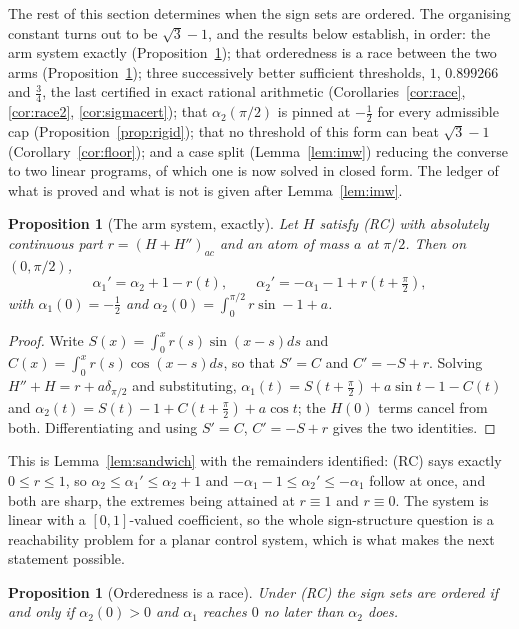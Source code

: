 \documentclass[11pt]{article}
\newtheorem{proposition}[theorem]{Proposition}
\theoremstyle{definition}
\begin{document}
The rest of this section determines when the sign sets are ordered. The organising
constant turns out to be $\sqrt3-1$, and the results below establish, in order: the arm
system exactly (Proposition~\ref{prop:armsys}); that orderedness is a race between the two
arms (Proposition~\ref{prop:race}); three successively better sufficient thresholds,
$1$, $0.899266$ and $\tfrac34$, the last certified in exact rational arithmetic
(Corollaries~\ref{cor:race}, \ref{cor:race2}, \ref{cor:sigmacert}); that $\alpha_2(\pi/2)$
is pinned at $-\tfrac12$ for every admissible cap (Proposition~\ref{prop:rigid}); that no
threshold of this form can beat $\sqrt3-1$ (Corollary~\ref{cor:floor}); and a case split
(Lemma~\ref{lem:imw}) reducing the converse to two linear programs, of which one is now
solved in closed form. The ledger of what is proved and what is not is given after
Lemma~\ref{lem:imw}.

\begin{proposition}[The arm system, exactly]\label{prop:armsys}
Let $H$ satisfy (RC) with absolutely continuous part $r=(H+H'')_{ac}$ and an atom of mass
$a$ at $\pi/2$. Then on $(0,\pi/2)$,
\[
  \alpha_1'=\alpha_2+1-r(t) ,\qquad
  \alpha_2'=-\alpha_1-1+r(t+\tfrac\pi2) ,
\]
with $\alpha_1(0)=-\tfrac12$ and $\alpha_2(0)=\int_0^{\pi/2}r\sin-1+a$.
\end{proposition}

\begin{proof}
Write $S(x)=\int_0^x r(s)\sin(x-s)ds$ and $C(x)=\int_0^x r(s)\cos(x-s)ds$, so that
$S'=C$ and $C'=-S+r$. Solving $H''+H=r+a\delta_{\pi/2}$ and substituting,
$\alpha_1(t)=S(t+\tfrac\pi2)+a\sin t-1-C(t)$ and
$\alpha_2(t)=S(t)-1+C(t+\tfrac\pi2)+a\cos t$; the $H(0)$ terms cancel from both.
Differentiating and using $S'=C$, $C'=-S+r$ gives the two identities.
\end{proof}

This is Lemma~\ref{lem:sandwich} with the remainders identified: (RC) says exactly
$0\le r\le1$, so $\alpha_2\le\alpha_1'\le\alpha_2+1$ and
$-\alpha_1-1\le\alpha_2'\le-\alpha_1$ follow at once, and both are sharp, the extremes
being attained at $r\equiv1$ and $r\equiv0$. The system is linear with a $[0,1]$-valued
coefficient, so the whole sign-structure question is a reachability problem for a planar
control system, which is what makes the next statement possible.

\begin{proposition}[Orderedness is a race]\label{prop:race}
Under (RC) the sign sets are ordered if and only if $\alpha_2(0)>0$ and $\alpha_1$ reaches
$0$ no later than $\alpha_2$ does.
\end{proposition}
\end{document}
